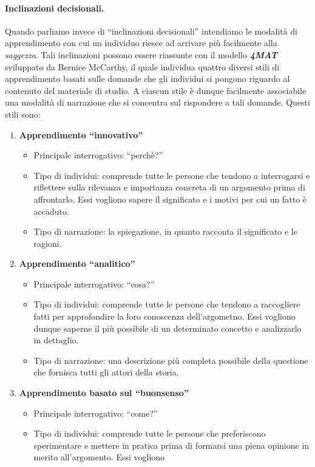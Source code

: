 \paragraph{Inclinazioni decisionali.}
Quando parliamo invece di ``inclinazioni decisionali'' intendiamo le modalità di apprendimento con cui un individuo riesce ad arrivare più facilmente alla \emph{saggezza}. 
Tali inclinazioni possono essere riassunte con il modello \emph{\textbf{4MAT}} sviluppato da Bernice McCarthy, il quale individua quattro diversi stili di apprendimento basati 
sulle domande che gli individui si pongono riguardo al contenuto del materiale di studio. A ciascun stile è dunque facilmente associabile una modalità di narrazione che si concentra
sul rispondere a tali domande.
Questi stili sono:
\begin{enumerate}
    \item \textbf{Apprendimento ``innovativo''}
    \begin{itemize}
        \item Principale interrogativo: ``perchè?''
        \item Tipo di individui: comprende tutte le persone che tendono a interrogarsi e riflettere sulla rilevanza e importanza concreta di un argomento prima di affrontarlo.
        Essi vogliono sapere il significato e i motivi per cui un fatto è accaduto.
        \item Tipo di narrazione: la spiegazione, in quanto racconta il significato e le ragioni.
    \end{itemize}
    \item \textbf{Apprendimento ``analitico''}
    \begin{itemize}
        \item Principale interrogativo: ``cosa?''
        \item Tipo di individui: comprende tutte le persone che tendono a raccogliere fatti per approfondire la loro conoscenza dell'argometno. Essi vogliono
        dunque saperne il più possibile di un determinato concetto e analizzarlo in dettaglio.
        \item Tipo di narrazione: una descrizione più completa possibile della questione che fornisca tutti gli attori della storia.
    \end{itemize}
    \item \textbf{Apprendimento basato sul ``buonsenso''}
    \begin{itemize}
        \item Principale interrogativo: ``come?''
        \item Tipo di individui: comprende tutte le persone che preferiscono sperimentare e mettere in pratica prima di formarsi una piena opinione in merito all'argomento. Essi vogliono

\end{itemize}
\end{enumerate}
